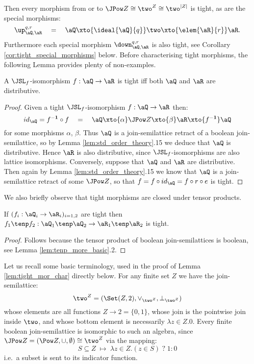 \documentclass{article}
\begin{document}
\smallskip
Then every morphism from or to $\JPow Z \cong \two^Z \cong \two^{|Z|}$ is tight, as are the special morphisms:
\[
\up_{\aQ,\aR}^{q,r} \quad = \quad \aQ \xto{\ideal{\aQ}{q}} \two \xto{\elem{\aR}{r}} \aR.
\]
Furthermore each special morphism $\down_{\aQ,\aR}^{q,r}$ is also tight, see Corollary \ref{cor:tight_special_morphisms} below. Before characterising tight morphisms, the following Lemma provides plenty of non-examples.

\begin{lemma}
\label{lem:jsl_iso_not_tight}
A $\JSL_f$-isomorphism $f : \aQ \to \aR$ is tight iff both $\aQ$ and $\aR$ are distributive.
\end{lemma}

\begin{proof}
Given a tight $\JSL_f$-isomorphism $f : \aQ \to \aR$ then:
\[
id_\aQ 
= f^{\bf-1} \circ f
\quad = \quad
\aQ \xto{\alpha} \JPow Z \xto{\beta} \aR \xto{f^{\bf-1}} \aQ
\]
for some morphisms $\alpha$, $\beta$. Thus $\aQ$ is a join-semilattice retract of a boolean join-semilattice, so by Lemma \ref{lem:std_order_theory}.15 we deduce that $\aQ$ is distributive. Hence $\aR$ is also distributive, since $\JSL_f$-isomorphisms are also lattice isomorphisms. Conversely, suppose that $\aQ$ and $\aR$ are distributive. Then again by Lemma \ref{lem:std_order_theory}.15 we know that $\aQ$ is a join-semilattice retract of some $\JPow Z$, so that $f = f \circ id_\aQ = f \circ r \circ e$ is tight.
\end{proof}

We also briefly observe that tight morphisms are closed under tensor products.

\begin{lemma}
If $(f_i : \aQ_i \to \aR_i)_{i = 1,2}$ are tight then $f_1 \tenp f_2 : \aQ_1 \tenp \aQ_2 \to \aR_1 \tenp \aR_2$ is tight.
\end{lemma}

\begin{proof}
Follows because the tensor product of boolean join-semilattices is boolean, see Lemma \ref{lem:tenp_more_basic}.2.
\end{proof}




\begin{note}
Let us recall some basic terminology, used in the proof of Lemma \ref{lem:tight_mor_char} directly below. For any finite set $Z$ we have the join-semilattice:
\[
\two^Z = (\Set(Z,2),\lor_{\two^Z},\bot_{\two^Z})
\]
whose elements are all functions $Z \to 2 = \{0,1\}$, whose join is the pointwise join inside $\two$, and whose bottom element is necessarily $\lambda z \in Z. 0$. Every finite boolean join-semilattice is isomorphic to such an algebra, since $\JPow Z = (\Pow Z,\cup,\emptyset) \cong \two^Z$ via the mapping:
\[
S \subseteq Z \; \mapsto \; \lambda z \in Z.(z \in S) \;?\; 1 : 0
\]
i.e.\ a subset is sent to its indicator function. \endbox
\end{note}
\end{document}
